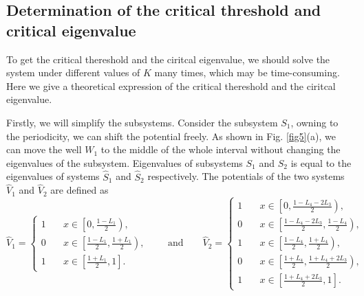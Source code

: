\documentclass[a4paper,11pt]{article}
\begin{document}
\subsection{Determination of the critical threshold and critical eigenvalue}

To get the critical thereshold and the ciritcal eigenvalue, we should solve the system under different values of $K$ many times, which may be time-consuming. Here we give a theoretical expression of the critical thereshold and the ciritcal eigenvalue.

Firstly, we will simplify the subsystems. Consider the subsystem $S_1$, owning to the periodicity, we can shift the potential freely. As shown in Fig. \ref{fig5}(a), we can move the well $W_1$ to the middle of the whole interval without changing the eigenvalues of the subsystem. Eigenvalues of subsystems $S_1$ and $S_2$ is equal to the eigenvalues of systems $\hat{S}_1$ and $\hat{S}_2$ respectively. The potentials of the two systems $\hat{V}_1$ and $\hat{V}_2$ are defined as
\begin{equation*}
\hat{V}_1 = \left\{
\begin{split}
1 & \quad x \in \left[ 0, \frac{1 - L_1}{2} \right), \\
0 & \quad x \in \left[ \frac{1 - L_1}{2}, \frac{1 + L_1}{2} \right), \\
1 & \quad x \in \left[ \frac{1 + L_1}{2}, 1 \right].
\end{split}
\right.
\qquad
\text{and}
\qquad
\hat{V}_2 = \left\{
\begin{split}
1 & \quad x \in \left[ 0, \frac{1 - L_4 - 2 L_3}{2} \right), \\
0 & \quad x \in \left[ \frac{1 - L_4 - 2 L_3}{2}, \frac{1 - L_4}{2} \right), \\
1 & \quad x \in \left[ \frac{1 - L_4}{2}, \frac{1 + L_4}{2} \right), \\
0 & \quad x \in \left[ \frac{1 + L_4}{2}, \frac{1 + L_4 + 2 L_3}{2} \right), \\
1 & \quad x \in \left[ \frac{1 + L_4 + 2 L_3}{2}, 1 \right].
\end{split}
\right.
\end{equation*}
\end{document}
